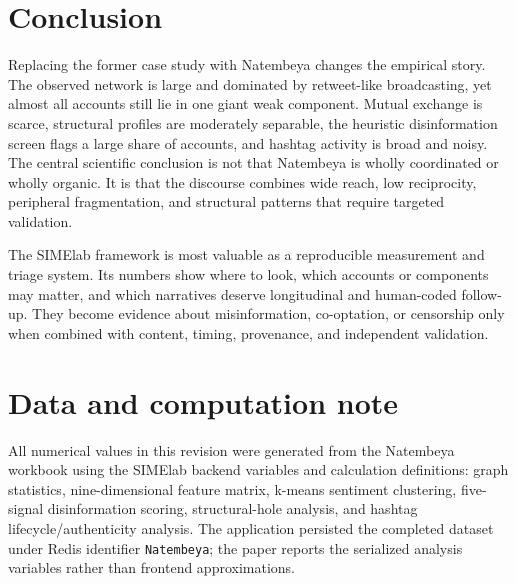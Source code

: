 \documentclass[11pt]{article}
\begin{document}
\section{Conclusion}

Replacing the former case study with Natembeya changes the empirical story. The observed network is large and dominated by retweet-like broadcasting, yet almost all accounts still lie in one giant weak component. Mutual exchange is scarce, structural profiles are moderately separable, the heuristic disinformation screen flags a large share of accounts, and hashtag activity is broad and noisy. The central scientific conclusion is not that Natembeya is wholly coordinated or wholly organic. It is that the discourse combines wide reach, low reciprocity, peripheral fragmentation, and structural patterns that require targeted validation.

The SIMElab framework is most valuable as a reproducible measurement and triage system. Its numbers show where to look, which accounts or components may matter, and which narratives deserve longitudinal and human-coded follow-up. They become evidence about misinformation, co-optation, or censorship only when combined with content, timing, provenance, and independent validation.

\section*{Data and computation note}
All numerical values in this revision were generated from the Natembeya workbook using the SIMElab backend variables and calculation definitions: graph statistics, nine-dimensional feature matrix, k-means sentiment clustering, five-signal disinformation scoring, structural-hole analysis, and hashtag lifecycle/authenticity analysis. The application persisted the completed dataset under Redis identifier \texttt{Natembeya}; the paper reports the serialized analysis variables rather than frontend approximations.
\end{document}
